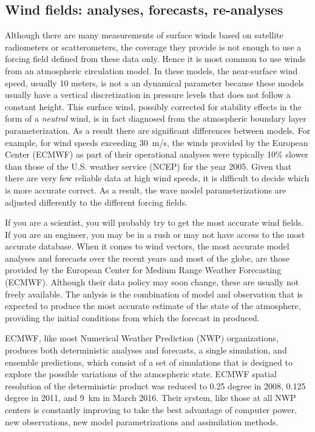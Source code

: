 \subsection{Wind fields: analyses, forecasts, re-analyses}
Although there are many measurements of surface winds based on satellite radiometers or scatterometers, the coverage they provide is not 
enough to use a forcing field defined from these data only. Hence it is most common to use winds from an atmospheric circulation model. In these models, 
the near-surface wind speed, usually 10 meters, is not a an dynamical parameter because these models usually have a vertical discretization in pressure 
levels that does not follow a constant height. This surface wind, possibly corrected for stability effects 
in the form of a \emph{neutral}
wind, is in fact diagnosed from the atmospheric boundary layer parameterization. 
As a result there are significant differences between models. For example, for wind speeds 
exceeding 30~m/s, the winds provided by the European Center (ECMWF) as part of their operational analyses were typically 10\% slower than those of the U.S. weather 
service (NCEP) for the year 2005.
Given that there are very few reliable data at high wind speeds, it is difficult to decide which is more accurate
correct. As a result, the wave model parameterizations are adjusted differently to the different forcing fields. 

If you are a scientist, you will probably try to get the most accurate wind fields. If you are an engineer, you may be in a rush or may not have 
access to the most accurate database. When it comes to wind vectors, the most accurate model analyses and forecasts over the recent years and 
most of the globe, are those provided by the European Center for Medium Range Weather Forecasting (ECMWF). 
Although their data policy may soon change, these are usually not freely available. The anlysis is the combination of model and observation that 
is expected to produce the most accurate estimate of the state of the atmosphere, providing the initial conditions from which the forecast in produced. 

ECMWF, like most Numerical Weather Prediction 
(NWP) organizations, produces both deterministic analyses and forecasts, a single simulation, and ensemble predictions, which consist of a set of 
simulations that is designed to explore the possible variations of the atmospheric state. ECMWF spatial resolution of the deterministic product 
was reduced to 0.25 degree in 2008,  0.125 
degree in 2011, and 9~km in March 2016. Their system, like those at all NWP centers is constantly improving to take the best advantage of computer power, 
new observations, new model parametrizations and assimilation methods. 

